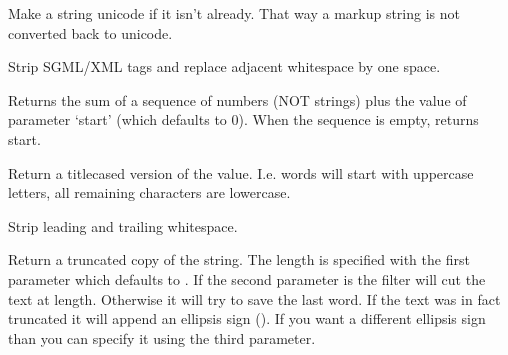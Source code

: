 \documentclass[a4paper,10pt,english]{sphinxmanual}
\begin{document}

\begin{fulllineitems}
\label{templates:string}
Make a string unicode if it isn't already.  That way a markup
string is not converted back to unicode.

\end{fulllineitems}


\begin{fulllineitems}
\label{templates:striptags}
Strip SGML/XML tags and replace adjacent whitespace by one space.

\end{fulllineitems}


\begin{fulllineitems}
\label{templates:sum}
Returns the sum of a sequence of numbers (NOT strings) plus the value
of parameter `start' (which defaults to 0).  When the sequence is
empty, returns start.

\end{fulllineitems}


\begin{fulllineitems}
\label{templates:title}
Return a titlecased version of the value. I.e. words will start with
uppercase letters, all remaining characters are lowercase.

\end{fulllineitems}


\begin{fulllineitems}
\label{templates:trim}
Strip leading and trailing whitespace.

\end{fulllineitems}


\begin{fulllineitems}
\label{templates:truncate}
Return a truncated copy of the string. The length is specified
with the first parameter which defaults to . If the second
parameter is  the filter will cut the text at length. Otherwise
it will try to save the last word. If the text was in fact
truncated it will append an ellipsis sign (). If you want a
different ellipsis sign than  you can specify it using the
third parameter.

\end{fulllineitems}
\end{document}
